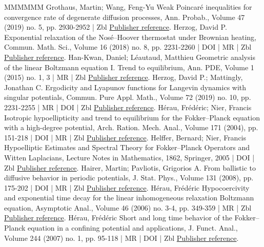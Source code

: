 \begin{thebibliography}{MMMMMM}
 Grothaus, Martin; Wang, Feng-Yu Weak Poincaré inequalities for convergence rate of degenerate diffusion processes, Ann. Probab., Volume 47 (2019) no. 5, pp. 2930-2952 | Zbl \href{https://ahl.centre-mersenne.org/item/AHL_2022__5__523_0/#GW19}{Publisher reference}.
 Herzog, David P. Exponential relaxation of the Nosé–Hoover thermostat under Brownian heating, Commun. Math. Sci., Volume 16 (2018) no. 8, pp. 2231-2260 | DOI | MR | Zbl \href{https://ahl.centre-mersenne.org/item/AHL_2022__5__523_0/#Herzog18}{Publisher reference}.
 Han-Kwan, Daniel; Léautaud, Matthieu Geometric analysis of the linear Boltzmann equation I. Trend to equilibrium, Ann. PDE, Volume 1 (2015) no. 1, 3 | MR | Zbl \href{https://ahl.centre-mersenne.org/item/AHL_2022__5__523_0/#HKL15}{Publisher reference}.
 Herzog, David P.; Mattingly, Jonathan C. Ergodicity and Lyapunov functions for Langevin dynamics with singular potentials, Commun. Pure Appl. Math., Volume 72 (2019) no. 10, pp. 2231-2255 | MR | DOI | Zbl \href{https://ahl.centre-mersenne.org/item/AHL_2022__5__523_0/#HM19}{Publisher reference}.
 Hérau, Frédéric; Nier, Francis Isotropic hypoellipticity and trend to equilibrium for the Fokker–Planck equation with a high-degree potential, Arch. Ration. Mech. Anal., Volume 171 (2004), pp. 151-218 | DOI | MR | Zbl \href{https://ahl.centre-mersenne.org/item/AHL_2022__5__523_0/#HN04}{Publisher reference}.
 Helffer, Bernard; Nier, Francis Hypoelliptic Estimates and Spectral Theory for Fokker–Planck Operators and Witten Laplacians, Lecture Notes in Mathematics, 1862, Springer, 2005 | DOI | Zbl \href{https://ahl.centre-mersenne.org/item/AHL_2022__5__523_0/#HN05}{Publisher reference}.
 Hairer, Martin; Pavliotis, Grigorios A. From ballistic to diffusive behavior in periodic potentials, J. Stat. Phys., Volume 131 (2008), pp. 175-202 | DOI | MR | Zbl \href{https://ahl.centre-mersenne.org/item/AHL_2022__5__523_0/#HP08}{Publisher reference}.
 Hérau, Frédéric Hypocoercivity and exponential time decay for the linear inhomogeneous relaxation Boltzmann equation, Asymptotic Anal., Volume 46 (2006) no. 3-4, pp. 349-359 | MR | Zbl \href{https://ahl.centre-mersenne.org/item/AHL_2022__5__523_0/#Herau06}{Publisher reference}.
 Hérau, Frédéric Short and long time behavior of the Fokker–Planck equation in a confining potential and applications, J. Funct. Anal., Volume 244 (2007) no. 1, pp. 95-118 | MR | DOI | Zbl \href{https://ahl.centre-mersenne.org/item/AHL_2022__5__523_0/#Herau07}{Publisher reference}.

\end{thebibliography}
